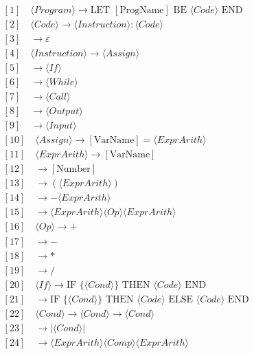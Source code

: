 \documentclass{article}
\begin{document}
	\begin{align*}
		&[1] \quad \langle Program \rangle \rightarrow \text{LET } [\text{ProgName}] \text{ BE } \langle Code \rangle \text{ END} \\
		&[2] \quad \langle Code \rangle \rightarrow \langle Instruction \rangle : \langle Code \rangle \\
		&[3] \quad \rightarrow \varepsilon \\
		&[4] \quad \langle Instruction \rangle \rightarrow \langle Assign \rangle \\
		&[5] \quad \rightarrow \langle If \rangle \\
		&[6] \quad \rightarrow \langle While \rangle \\
		&[7] \quad \rightarrow \langle Call \rangle \\
		&[8] \quad \rightarrow \langle Output \rangle \\
		&[9] \quad \rightarrow \langle Input \rangle \\
		&[10] \quad \langle Assign \rangle \rightarrow [\text{VarName}] = \langle ExprArith \rangle \\
		&[11] \quad \langle ExprArith \rangle \rightarrow [\text{VarName}] \\
		&[12] \quad \rightarrow [\text{Number}] \\
		&[13] \quad \rightarrow ( \langle ExprArith \rangle ) \\
		&[14] \quad \rightarrow - \langle ExprArith \rangle \\
		&[15] \quad \rightarrow \langle ExprArith \rangle \langle Op \rangle \langle ExprArith \rangle \\
		&[16] \quad \langle Op \rangle \rightarrow + \\
		&[17] \quad \rightarrow - \\
		&[18] \quad \rightarrow * \\
		&[19] \quad \rightarrow / \\
		&[20] \quad \langle If \rangle \rightarrow \text{IF } \{ \langle Cond \rangle \} \text{ THEN } \langle Code \rangle \text{ END} \\
		&[21] \quad \rightarrow \text{IF } \{ \langle Cond \rangle \} \text{ THEN } \langle Code \rangle \text{ ELSE } \langle Code \rangle \text{ END} \\
		&[22] \quad \langle Cond \rangle \rightarrow \langle Cond \rangle \rightarrow \langle Cond \rangle \\
		&[23] \quad \rightarrow | \langle Cond \rangle | \\
		&[24] \quad \rightarrow \langle ExprArith \rangle \langle Comp \rangle \langle ExprArith \rangle \\

\end{align*}
\end{document}
